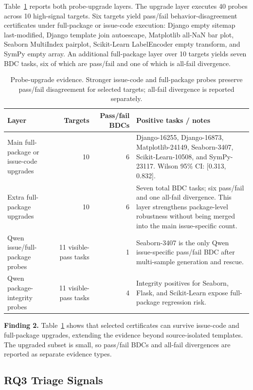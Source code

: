 \documentclass[conference]{IEEEtran}
\newcommand{\bdcs}{behavior-disagreement certificates\xspace}
\begin{document}
Table~\ref{tab:upgrades} reports both probe-upgrade layers.
The upgrade layer executes 40 probes across 10 high-signal targets.
Six targets yield pass/fail \bdcs under full-package or issue-code execution: Django empty sitemap last-modified, Django template join autoescape, Matplotlib all-NaN bar plot, Seaborn MultiIndex pairplot, Scikit-Learn LabelEncoder empty transform, and SymPy empty array.
An additional full-package layer over 10 targets yields seven BDC tasks, six of which are pass/fail and one of which is all-fail divergence.

\begin{table}[t]
\caption{Probe-upgrade evidence. Stronger issue-code and full-package probes preserve pass/fail disagreement for selected targets; all-fail divergence is reported separately.}
\label{tab:upgrades}
\centering
\begin{tabularx}{\textwidth}{lrr>{\raggedright\arraybackslash}X}
\toprule
Layer & Targets & Pass/fail BDCs & Positive tasks / notes \\
\midrule
Main full-package or issue-code upgrades & 10 & 6 & Django-16255, Django-16873, Matplotlib-24149, Seaborn-3407, Scikit-Learn-10508, and SymPy-23117. Wilson 95\% CI: [0.313, 0.832]. \\
Extra full-package upgrades & 10 & 6 & Seven total BDC tasks; six pass/fail and one all-fail divergence. This layer strengthens package-level robustness without being merged into the main issue-specific count. \\
Qwen issue/full-package probes & 11 visible-pass tasks & 1 & Seaborn-3407 is the only Qwen issue-specific pass/fail BDC after multi-sample generation and rescue. \\
Qwen package-integrity probes & 11 visible-pass tasks & 4 & Integrity positives for Seaborn, Flask, and Scikit-Learn expose full-package regression risk. \\
\bottomrule
\end{tabularx}
\end{table}

\noindent\textbf{Finding 2.}
Table~\ref{tab:upgrades} shows that selected certificates can survive issue-code and full-package upgrades, extending the evidence beyond source-isolated templates.
The upgraded subset is small, so pass/fail BDCs and all-fail divergences are reported as separate evidence types.

\subsection{RQ3 Triage Signals}
\end{document}
